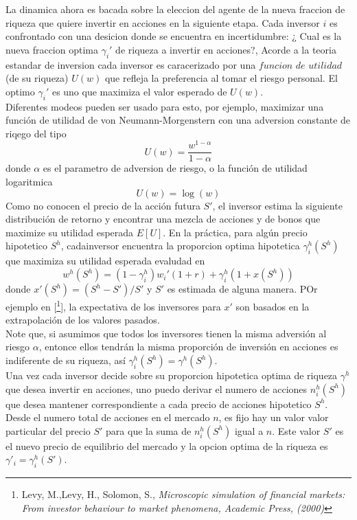 \documentclass[12pt,a4paper]{article}
\begin{document}
\quad La dinamica ahora es bacada sobre la eleccion del agente de la nueva fraccion de riqueza que quiere invertir en acciones en la siguiente etapa. Cada inversor $i$ es confrontado con una desicion donde se encuentra en incertidumbre: ¿ Cual es la nueva fraccion optima $\gamma_i'$ de riqueza a invertir en acciones?, Acorde a la teoria estandar de inversion cada inversor es caracerizado por una $ \textit{funcion de utilidad}$ (de su riqueza) $U(w)$ que refleja la preferencia al tomar el riesgo personal. El optimo $\gamma_i'$ es uno que maximiza el valor esperado de $U(w)$.\\
\quad Diferentes modeos pueden ser usado para esto, por ejemplo, maximizar una función de utilidad de von Neumann-Morgenstern con una adversion constante de riqego del tipo
\begin{equation}
U(w)= \frac{w^{1-\alpha}}{1-\alpha}
\end{equation}
donde $\alpha$ es el parametro de adversion de riesgo, o la función de utilidad logaritmica
\begin{equation}
U(w)=\log{(w)}
\end{equation}
Como no conocen el precio de la acción futura $S'$, el inversor estima la siguiente distribución de retorno y encontrar una mezcla de acciones y de bonos que maximize su utilidad esperada $E[U]$. En la práctica, para algún precio hipotetico $S^{h}$, cadainversor encuentra la proporcion optima hipotetica $\gamma_i^{h}(S^h)$ que maximiza su utilidad esperada evaludad en
\begin{equation}
w^h(S^h)=(1-\gamma^h_i)w_i'(1+r) +\gamma^h_i(1+x(S^h))
\end{equation}
donde $x'(S^h)=(S^h-S')/S'$ y $S'$ es estimada de alguna manera. POr ejemplo en [\footnote{Levy, M.,Levy, H., Solomon, S., \textit{Microscopic simulation of financial markets: From investor behaviour to market phenomena, Academic Press, (2000)}}], la expectativa de los inversores para  $x'$ son basados en la extrapolación de los valores pasados.\\
\quad Note que, si asumimos que todos los inversores tienen la misma adversión al riesgo $\alpha$, entonce ellos tendrán la misma proporción de inversión en acciones es indiferente de su riqueza, así $\gamma^{h}_i(S^{h})=\gamma^{h}(S^{h})$.\\
\quad Una vez cada inversor decide sobre su proporcion hipotetica optima de riqueza $\gamma^{h}$ que desea invertir en acciones, uno puedo derivar el numero de acciones $n^{h}_i(S^{h})$ que desea mantener correspondiente a cada precio de acciones hipotetico $S^{h}$. Desde el numero total de acciones en el mercado $n$, es fijo hay un valor valor particular del precio $S'$ para que la suma de $n^{h}_i(S^h)$ igual a $n$. Este valor $S'$ es el nuevo precio de equilibrio del mercado y la opcion optima de la riqueza es $\gamma'_i=\gamma^{h}_i(S')$.\\
\end{document}
